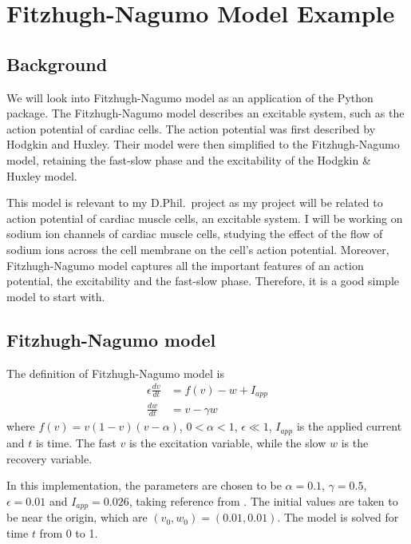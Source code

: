 \chapter{Fitzhugh-Nagumo Model Example}
\label{chap:fitzhugh-nagumo}
\section{Background}
\label{sec:background}
We will look into Fitzhugh-Nagumo model as an application of the Python package. The Fitzhugh-Nagumo model describes an excitable system, such as the action potential of cardiac cells. The action potential was first described by Hodgkin and Huxley. Their model were then simplified to the Fitzhugh-Nagumo model, retaining the fast-slow phase and the excitability of the Hodgkin \& Huxley model. \cite{Keener2009}

This model is relevant to my D.Phil.~project as my project will be related to action potential of cardiac muscle cells, an excitable system. I will be working on sodium ion channels of cardiac muscle cells, studying the effect of the flow of sodium ions across the cell membrane on the cell's action potential. Moreover, Fitzhugh-Nagumo model captures all the important features of an action potential, the excitability and the fast-slow phase. Therefore, it is a good simple model to start with.

\section{Fitzhugh-Nagumo model}
\label{sec:FHN}
The definition of Fitzhugh-Nagumo model is
\begin{align}
\label{eqn:FHN}
    \epsilon \frac{dv}{dt} &= f(v) - w + I_{app} \\
    \frac{dw}{dt} &= v - \gamma w \label{eqn:FHN-end}
\end{align}
where $f(v) = v(1-v)(v-\alpha)$, $0 < \alpha < 1$, $\epsilon \ll 1$, $I_{app}$ is the applied current and $t$ is time. The fast $v$ is the excitation variable, while the slow $w$ is the recovery variable.

In this implementation, the parameters are chosen to be $\alpha = 0.1$, $\gamma = 0.5$, $\epsilon = 0.01$ and $I_{app} = 0.026$, taking reference from \cite{Chapwanya2018}.
The initial values are taken to be near the origin, which are $(v_0, w_0) = (0.01, 0.01)$. The model is solved for time $t$ from 0 to 1.

